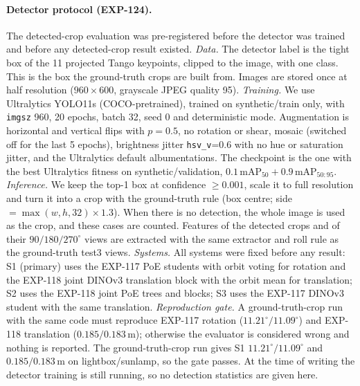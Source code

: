\paragraph{Detector protocol (EXP-124).}\label{app:spp_det}
The detected-crop evaluation was pre-registered before the detector was trained and before any detected-crop result existed.
\emph{Data.} The detector label is the tight box of the 11 projected Tango keypoints, clipped to the image, with one class. This is the box the ground-truth crops are built from. Images are stored once at half resolution ($960\times600$, grayscale JPEG quality 95).
\emph{Training.} We use Ultralytics YOLO11s (COCO-pretrained), trained on synthetic/train only, with \texttt{imgsz} 960, 20 epochs, batch 32, seed 0 and deterministic mode. Augmentation is horizontal and vertical flips with $p=0.5$, no rotation or shear, mosaic (switched off for the last 5 epochs), brightness jitter \texttt{hsv\_v}=0.6 with no hue or saturation jitter, and the Ultralytics default albumentations. The checkpoint is the one with the best Ultralytics fitness on synthetic/validation, $0.1\,\text{mAP}_{50}+0.9\,\text{mAP}_{50:95}$.
\emph{Inference.} We keep the top-1 box at confidence $\ge0.001$, scale it to full resolution and turn it into a crop with the ground-truth rule (box centre; side $=\max(w,h,32)\times1.3$). When there is no detection, the whole image is used as the crop, and these cases are counted. Features of the detected crops and of their $90/180/270^\circ$ views are extracted with the same extractor and roll rule as the ground-truth test3 views.
\emph{Systems.} All systems were fixed before any result:
S1 (primary) uses the EXP-117 PoE students with orbit voting for rotation and the EXP-118 joint DINOv3 translation block with the orbit mean for translation;
S2 uses the EXP-118 joint PoE trees and blocks;
S3 uses the EXP-117 DINOv3 student with the same translation.
\emph{Reproduction gate.} A ground-truth-crop run with the same code must reproduce EXP-117 rotation ($11.21^\circ/11.09^\circ$) and EXP-118 translation ($0.185/0.183$\,m); otherwise the evaluator is considered wrong and nothing is reported. The ground-truth-crop run gives S1 $11.21^\circ/11.09^\circ$ and $0.185/0.183$\,m on lightbox/sunlamp, so the gate passes.
At the time of writing the detector training is still running, so no detection statistics are given here.

